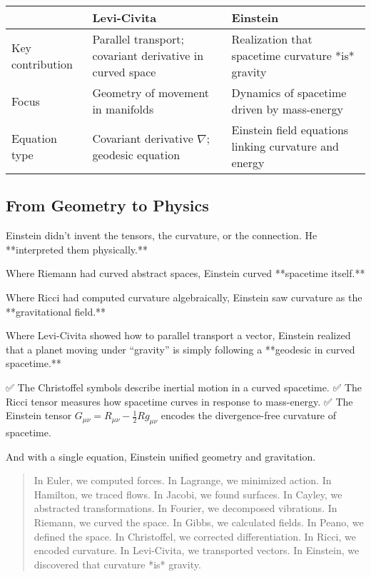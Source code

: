 \bigskip

\begin{tcolorbox}[colback=gray!5!white, colframe=black, title=\textbf{Sidebar: The Shift from Levi-Civita to Einstein}, fonttitle=\bfseries, arc=1.5mm, boxrule=0.4pt]

\begin{tabular}{>{\raggedright}p{4cm} >{\raggedright}p{5.5cm} >{\raggedright\arraybackslash}p{5.5cm}}
 & \textbf{Levi-Civita} & \textbf{Einstein} \\
\midrule
Key contribution & Parallel transport; covariant derivative in curved space & Realization that spacetime curvature *is* gravity \\
Focus & Geometry of movement in manifolds & Dynamics of spacetime driven by mass-energy \\
Equation type & Covariant derivative \( \nabla \); geodesic equation & Einstein field equations linking curvature and energy
\end{tabular}

\end{tcolorbox}

\bigskip

\subsection*{From Geometry to Physics}

Einstein didn’t invent the tensors, the curvature, or the connection.  
He **interpreted them physically.**

Where Riemann had curved abstract spaces,  
Einstein curved **spacetime itself.**

Where Ricci had computed curvature algebraically,  
Einstein saw curvature as the **gravitational field.**

Where Levi-Civita showed how to parallel transport a vector,  
Einstein realized that a planet moving under “gravity” is simply following a **geodesic in curved spacetime.**

✅ The Christoffel symbols describe inertial motion in a curved spacetime.  
✅ The Ricci tensor measures how spacetime curves in response to mass-energy.  
✅ The Einstein tensor \( G_{\mu\nu} = R_{\mu\nu} - \tfrac{1}{2} R g_{\mu\nu} \) encodes the divergence-free curvature of spacetime.

And with a single equation, Einstein unified geometry and gravitation.

\bigskip

\begin{quote}
In Euler, we computed forces.  
In Lagrange, we minimized action.  
In Hamilton, we traced flows.  
In Jacobi, we found surfaces.  
In Cayley, we abstracted transformations.  
In Fourier, we decomposed vibrations.  
In Riemann, we curved the space.  
In Gibbs, we calculated fields.  
In Peano, we defined the space.  
In Christoffel, we corrected differentiation.  
In Ricci, we encoded curvature.  
In Levi-Civita, we transported vectors.  
In Einstein, we discovered that curvature *is* gravity.
\end{quote}

